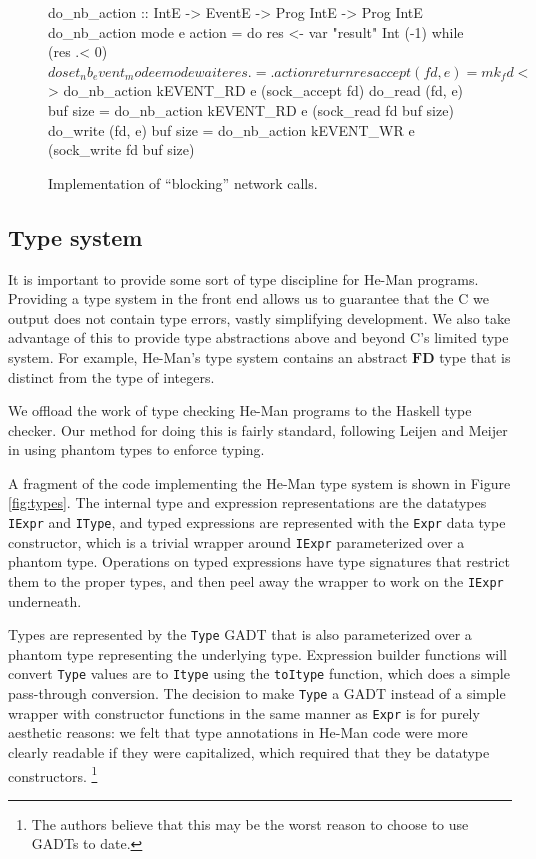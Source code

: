 \documentclass[preprint]{sigplanconf}
\renewcommand{\t}{\texttt}
\renewcommand{\b}{\textbf}
\begin{document}
\begin{figure}[ht]
\centering
\begin{code}
do_nb_action :: IntE -> EventE -> Prog IntE
                -> Prog IntE
do_nb_action mode e action = do
  res <- var "result" Int (-1)
  while (res .< 0) $ do
    set_nb_event_mode e mode
    wait e
    res .=. action
  return res

accept (fd, e) =
  mk_fd <$> do_nb_action kEVENT_RD e (sock_accept fd)
do_read (fd, e) buf size =
  do_nb_action kEVENT_RD e (sock_read fd buf size)
do_write (fd, e) buf size =
  do_nb_action kEVENT_WR e (sock_write fd buf size)
\end{code}
\caption{Implementation of ``blocking'' network calls.}
\label{fig:generic}
\end{figure}

\subsection{Type system}

It is important to provide some sort of type discipline for He-Man
programs. Providing a type system in the front end allows us to
guarantee that the C we output does not contain type errors, vastly
simplifying development. We also take advantage of this to provide
type abstractions above and beyond C's limited type system. %
For example, He-Man's type system contains an abstract
$\b{FD}$ type that is distinct from the type of integers.

We offload the work of type checking He-Man programs to the Haskell type
checker. Our method for doing this is fairly standard, following Leijen and
Meijer \cite{LeijenMeijer} in using phantom types to enforce typing.

A fragment of the code implementing the He-Man type system is shown in
Figure \ref{fig:types}. The internal type and expression
representations are the datatypes \t{IExpr} and \t{IType}, and
typed expressions are represented with the \t{Expr} data type
constructor, which is a trivial wrapper around \t{IExpr} parameterized
over a phantom type. Operations on typed expressions have type
signatures that restrict them to the proper types, and then peel away
the wrapper to work on the \t{IExpr} underneath.

Types are represented by the \t{Type} GADT that is also parameterized
over a phantom type representing the underlying type. Expression
builder functions will convert \t{Type} values are to \t{Itype} using
the \t{toItype} function, which does a simple pass-through conversion.
The decision to make \t{Type} a GADT instead of a simple wrapper with
constructor functions in the same manner as \t{Expr} is for purely
aesthetic reasons: we felt that type annotations in He-Man code were
more clearly readable if they were capitalized, which required that
they be datatype constructors.
\footnote{The authors believe that this may be the worst reason to
  choose to use GADTs to date.}
\end{document}
